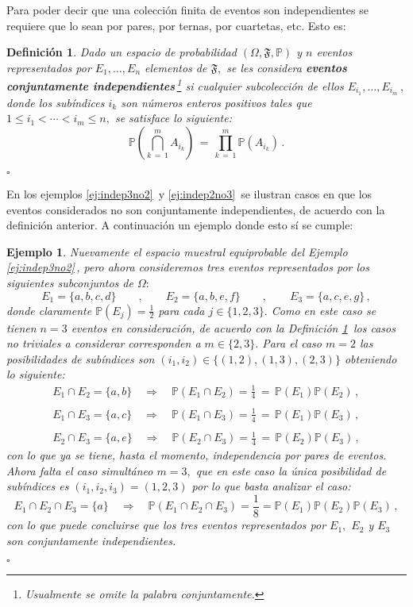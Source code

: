 \documentclass[spanish,10pt,letterpaper]{article}
\newtheorem{defi}{Definición}
\newtheorem{ejem}{Ejemplo}
\newcommand{\prob}{\mathbb{P}}
\newcommand{\qed}{\begin{flushright}$\square$\end{flushright}}
\begin{document}
	Para poder decir que una colección finita de eventos son independientes se requiere que lo sean por pares, por ternas, por cuartetas, etc. Esto es:
	
	\bigskip 
	
	\begin{defi}\label{def:indep}
		Dado un espacio de probabilidad $(\Omega,\mathfrak{F},\prob)$ y $n$ eventos representados por $E_1,\ldots,E_n$ elementos de $\mathfrak{F},$ se les considera \textbf{eventos conjuntamente independientes}\,\footnote{Usualmente se omite la palabra \textit{conjuntamente}.} si cualquier subcolección de ellos $E_{i_1},\ldots,E_{i_m}\,,$ donde los subíndices $i_k$ son números enteros positivos tales que $1\leq i_1<\cdots<i_m\leq n,$ se satisface lo siguiente: $$\prob\left(\bigcap_{k\,=\,1}^m A_{i_k}\right) \,=\, \prod_{k\,=\,1}^m\prob(A_{i_k})\,.$$ \qed 
	\end{defi}
	
	En los ejemplos \ref{ej:indep3no2}\, y \ref{ej:indep2no3}\, se ilustran casos en que los eventos considerados no son conjuntamente independientes, de acuerdo con la definición anterior. A continuación un ejemplo donde esto sí se cumple:
	
	\bigskip 
	
	\begin{ejem}\label{ej:indep}
		Nuevamente el espacio muestral equiprobable del Ejemplo \ref{ej:indep3no2}\,, pero ahora consideremos tres eventos representados por los siguientes subconjuntos de $\Omega:$ $$E_1=\{a,b,c,d\} \qquad,\qquad E_2=\{a,b,e,f\} \qquad,\qquad E_3=\{a,c,e,g\}\,,$$donde claramente $\prob(E_j)=\frac{1}{2}$ para cada $j\in\{1,2,3\}.$ Como en este caso se tienen $n=3$ eventos en consideración, de acuerdo con la Definición \ref{def:indep}\, los casos no triviales a considerar corresponden a $m\in\{2,3\}.$ Para el caso $m=2$ las posibilidades de subíndices son $(i_1,i_2)\in\{(1,2),(1,3),(2,3)\}$ obteniendo lo siguiente:
		\begin{align*}
			E_1\cap E_2=\{a,b\} \quad\Rightarrow\quad \prob(E_1\cap E_2)=\frac{1}{4}\,=\,\prob(E_1)\prob(E_2)\,, \\
			{ } \\
			E_1\cap E_3=\{a,c\} \quad\Rightarrow\quad \prob(E_1\cap E_3)=\frac{1}{4}\,=\,\prob(E_1)\prob(E_3)\,, \\ 
			{ } \\
			E_2\cap E_3=\{a,e\} \quad\Rightarrow\quad \prob(E_2\cap E_3)=\frac{1}{4}\,=\,\prob(E_2)\prob(E_3)\,,
		\end{align*}
		con lo que ya se tiene, hasta el momento, independencia por pares de eventos. Ahora falta el caso simultáneo $m=3,$ que en este caso la única posibilidad de subíndices es $(i_1,i_2,i_3)=(1,2,3)$ por lo que basta analizar el caso: 
		$$E_1\cap E_2\cap E_3 = \{a\} \quad\Rightarrow\quad \prob(E_1\cap E_2\cap E_3) = \frac{1}{8} = \prob(E_1)\prob(E_2)\prob(E_3)\,,$$
		con lo que puede concluirse que los tres eventos representados por $E_1,$ $E_2$ y $E_3$ son conjuntamente independientes. \qed 
	\end{ejem}
	
\end{document}

